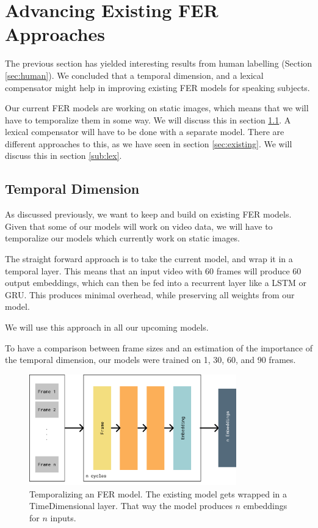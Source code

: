 \section{Advancing Existing FER Approaches}
\label{sec:models}

The previous section has yielded interesting results from human labelling (Section \ref{sec:human}). We concluded that a temporal dimension, and a lexical compensator might help in improving existing FER models for speaking subjects. 

Our current FER models are working on static images, which means that we will have to temporalize them in some way. We will discuss this in section \ref{sub:temp}. A lexical compensator will have to be done with a separate model. There are different approaches to this, as we have seen in section \ref{sec:existing}. We will discuss this in section \ref{sub:lex}.


\subsection{Temporal Dimension}
\label{sub:temp}
As discussed previously, we want to keep and build on existing FER models. Given that some of our models will work on video data, we will have to temporalize our models which currently work on static images.

The straight forward approach is to take the current model, and wrap it in a temporal layer. This means that an input video with 60 frames will produce 60 output embeddings, which can then be fed into a recurrent layer like a LSTM or GRU. This produces minimal overhead, while preserving all weights from our model.

We will use this approach in all our upcoming models.

To have a comparison between frame sizes and an estimation of the importance of the temporal dimension, our models were trained on 1, 30, 60, and 90 frames.

\begin{figure}
    \centering
    \includegraphics[width=0.8\textwidth]{res/temporalization.pdf}
    \caption{Temporalizing an FER model. The existing model gets wrapped in a TimeDimensional layer. That way the model produces $n$ embeddings for $n$ inputs.}
    \label{fig:temporalization}
\end{figure}

